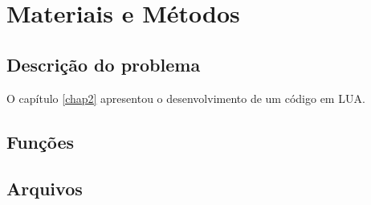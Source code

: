 \section{Materiais e Métodos}

\subsection{Descrição do problema}
O capítulo \ref{chap2} apresentou o desenvolvimento de um código em LUA.

\subsection{Funções}


\subsection{Arquivos}
